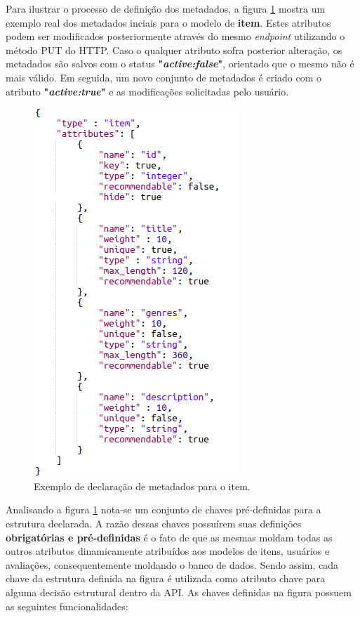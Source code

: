 \documentclass[12pt, openright, oneside, a4paper, brazil]{abntex2}
\begin{document}
Para ilustrar o processo de definição dos metadados, a figura \ref{metadata} mostra um exemplo real dos metadados inciais para o modelo de \textbf{item}. Estes atributos podem ser modificados posteriormente através do mesmo \textit{endpoint} utilizando o método PUT do HTTP. Caso o qualquer atributo sofra posterior alteração, os metadados são salvos com o status \textbf{"\textit{active:false}"}, orientado que o mesmo não é mais válido. Em seguida, um novo conjunto de metadados é criado com o atributo \textbf{"\textit{active:true}"} e as modificações solicitadas pelo usuário.

\begin{figure}[htp]
	\caption{\label{metadata}Exemplo de declaração de metadados para o item.}
	\begin{center}
		\includegraphics[scale=0.8]{images/metadata.png}
	\end{center}
	\hspace{5.5cm}{Fonte: O Autor.}
\end{figure}

Analisando a figura \ref{metadata} nota-se um conjunto de chaves pré-definidas para a estrutura declarada. A razão dessas chaves possuírem suas definições \textbf{obrigatórias e pré-definidas} é o fato de que as mesmas moldam todas as outros atributos dinamicamente atribuídos aos modelos de itens, usuários e avaliações, consequentemente moldando o banco de dados. Sendo assim, cada chave da estrutura definida na figura é utilizada como atributo chave para alguma decisão estrutural dentro da API. As chaves definidas na figura possuem as seguintes funcionalidades:
\end{document}
